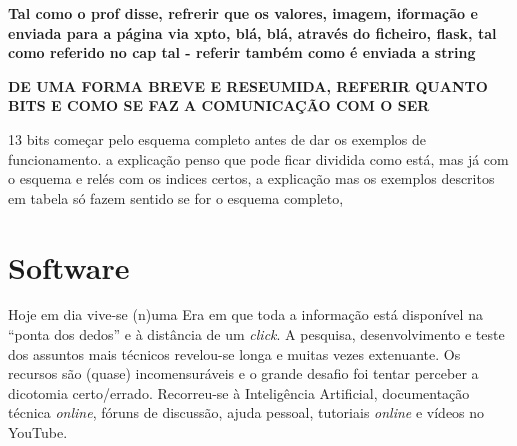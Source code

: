 \begin{table}[htb]
	\centering
	\caption{Exemplo funcionamento do rectificador de meia onda} 
	\label{Table:rectificadoresfiltros}
\end{table}

\textbf{Tal como o prof disse, refrerir que os valores, imagem, iformação e enviada para a página via xpto, blá, blá, através do ficheiro, flask, tal como referido no cap tal - referir também como é enviada a string}

\textbf{DE UMA FORMA BREVE E RESEUMIDA, REFERIR QUANTO BITS E COMO SE FAZ A COMUNICAÇÃO COM O SER}

13 bits começar pelo esquema completo antes de dar os exemplos de funcionamento. a explicação penso que pode ficar dividida como está, mas já com o esquema e relés com os indices certos, a explicação mas os exemplos descritos em tabela só fazem sentido se for o esquema completo,

\section{Software}
\label{sec:implementacaosoftware}
Hoje em dia vive-se (n)uma Era em que toda a informação está disponível na ``ponta dos dedos'' e à distância de um \textit{click}. A pesquisa, desenvolvimento e teste dos assuntos mais técnicos revelou-se longa e muitas vezes extenuante. Os recursos são (quase) incomensuráveis e o grande desafio foi tentar perceber a dicotomia certo/errado. Recorreu-se à Inteligência Artificial, documentação técnica \textit{online}, fóruns de discussão, ajuda pessoal, tutoriais \textit{online} e vídeos no YouTube.

